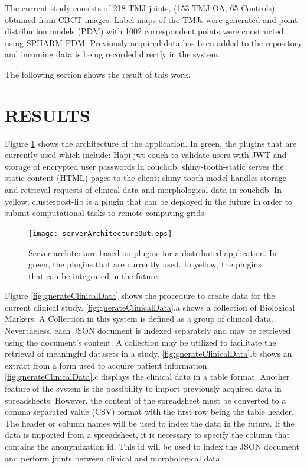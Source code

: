 \documentclass[]{spie}  %
\begin{document}
The current study consists of 218 TMJ joints, (153 TMJ OA, 65 Controls) obtained from CBCT 
images. Label maps of the TMJs were generated and point distribution models (PDM) with 1002 correspondent 
points were constructed using SPHARM-PDM\cite{Styner2006}. Previously acquired data has been added to the repository and incoming data is being recorded directly in the system.

The following section shows the result of this work. 

\section{RESULTS} 

Figure \ref{fig:serverArchitectureOut} shows the architecture of the application. In green, the plugins that are currently used which include: Hapi-jwt-couch to validate users with JWT and storage of encrypted user passwords in couchdb; shiny-tooth-static serves the static content (HTML) pages to the client; shiny-tooth-model handles storage and retrieval requests of clinical data and morphological data in couchdb. 
In yellow, clusterpost-lib is a plugin that can be deployed in the future in order to submit computational tasks to remote computing grids. 

\begin{figure}
	\centering 
	\texttt{[image: serverArchitectureOut.eps]}
	\caption[Server architecture]{Server architecture based on plugins for a distributed application. In green, the plugins that are currently used. In yellow, the plugins that can be integrated in the future.}
	\label{fig:serverArchitectureOut}
\end{figure} 

Figure \ref{fig:gnerateClinicalData} shows the procedure to create data for the current clinical study. 
\ref{fig:gnerateClinicalData}.a shows a collection of Biological Markers. A Collection in this system is defined as a group of clinical data. Nevertheless, 
each JSON document is indexed separately and may be retrieved using the document's content. A collection may be utilized to facilitate the retrieval of meaningful datasets in a study. \ref{fig:gnerateClinicalData}.b shows an extract from a form used to acquire patient information. 
\ref{fig:gnerateClinicalData}.c displays the clinical data in a table format. Another feature of the system is the possibility to import previously acquired data in spreadsheets. However, the content of the spreadsheet must be converted to a comma separated value (CSV) format with the first row being the table header. The header or column names will be used to index the data in the future. If the data is imported from a spreadsheet, it is necessary to specify the column that contains the anonymization id. This id will be used to index the JSON document and perform joints between clinical and morphological data.
\end{document}
